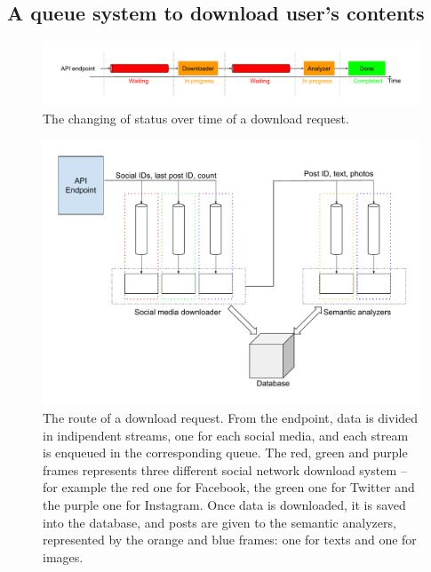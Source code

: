 \subsection{A queue system to download user's contents}
\label{sec:downloadqueues}

\begin{figure}
\centering
\includegraphics[width=%
1\textwidth]{img/DownloadStatuses}
\caption{The changing of status over time of a download request.}
\label{fig:statuses}
\end{figure}

\begin{figure}
\centering
\includegraphics[width=%
1\textwidth]{img/Queues}
\caption{The route of a download request. From the endpoint, data is divided in indipendent streams, one for each social media, and each stream is enqueued in the corresponding queue. The red, green and purple frames represents three different social network download system -- for example the red one for Facebook, the green one for Twitter and the purple one for Instagram. Once data is downloaded, it is saved into the database, and posts are given to the semantic analyzers, represented by the orange and blue frames: one for texts and one for images.}
\label{fig:queues}
\end{figure}

